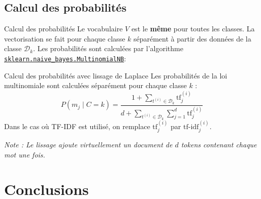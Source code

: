 \documentclass[10pt]{beamer}  %
\begin{document}
\subsection[Calcul des probabilités]{Calcul des probabilités}

\begin{frame}{Calcul des probabilités}
	Le vocabulaire $V$ est le \textbf{même} pour toutes les classes. La vectorisation se fait pour chaque classe $k$ séparément à partir des données de la classe $\mathcal{D}_k$. Les probabilités sont calculées par l'algorithme \href{https://scikit-learn.org/stable/modules/generated/sklearn.naive_bayes.MultinomialNB.html}{\texttt{sklearn.naive\_bayes.MultinomialNB}}:
	\begin{block}{Calcul des probabilités avec lissage de Laplace}
		Les probabilités de la loi multinomiale sont calculées séparément pour chaque classe $k$ :
		\begin{equation}
			P(m_j \mid C = k) = \frac{1 + \underset{t^{(i)} \in \mathcal{D}_k}{\sum} \text{tf}^{(i)}_j}{d + \underset{t^{(i)} \in \mathcal{D}_k}{\sum} \sum_{j=1}^d \text{tf}^{(i)}_j}
			\nonumber
		\end{equation}
		Dans le cas où TF-IDF est utilisé, on remplace $\text{tf}^{(i)}_j$ par $\text{tf-idf}^{(i)}_j$.
	\end{block}
	\textit{Note : Le lissage ajoute virtuellement un document de $d$ tokens contenant chaque mot une fois.}
\end{frame}


\section{Conclusions}
\end{document}

